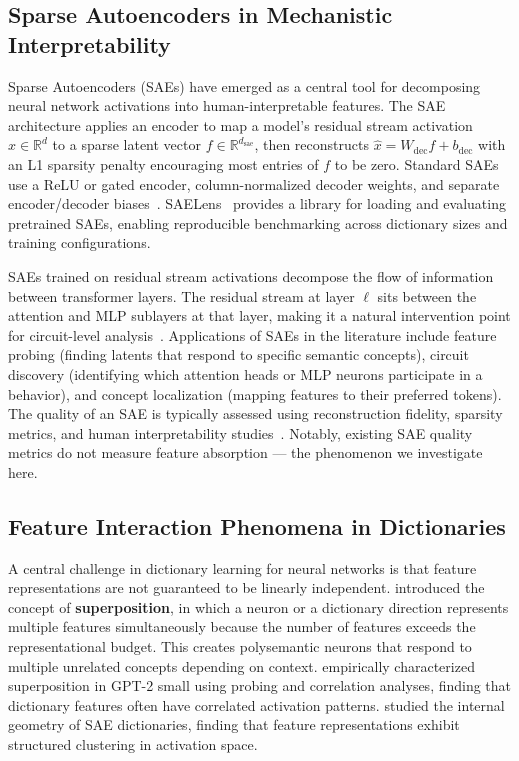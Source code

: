 \documentclass{article}
\begin{document}
\subsection{Sparse Autoencoders in Mechanistic Interpretability}

Sparse Autoencoders (SAEs) have emerged as a central tool for decomposing neural network activations into human-interpretable features. The SAE architecture applies an encoder to map a model's residual stream activation $x \in \mathbb{R}^d$ to a sparse latent vector $f \in \mathbb{R}^{d_{\text{sae}}}$, then reconstructs $\hat{x} = W_{\text{dec}} f + b_{\text{dec}}$ with an L1 sparsity penalty encouraging most entries of $f$ to be zero. Standard SAEs use a ReLU or gated encoder, column-normalized decoder weights, and separate encoder/decoder biases~\citep{bricken2023,anthropic2023}. SAELens~\citep{bloomfield2024} provides a library for loading and evaluating pretrained SAEs, enabling reproducible benchmarking across dictionary sizes and training configurations.

SAEs trained on residual stream activations decompose the flow of information between transformer layers. The residual stream at layer $\ell$ sits between the attention and MLP sublayers at that layer, making it a natural intervention point for circuit-level analysis~\citep{elhage2021}. Applications of SAEs in the literature include feature probing (finding latents that respond to specific semantic concepts), circuit discovery (identifying which attention heads or MLP neurons participate in a behavior), and concept localization (mapping features to their preferred tokens). The quality of an SAE is typically assessed using reconstruction fidelity, sparsity metrics, and human interpretability studies~\citep{bloomfield2024}. Notably, existing SAE quality metrics do not measure feature absorption --- the phenomenon we investigate here.

\subsection{Feature Interaction Phenomena in Dictionaries}

A central challenge in dictionary learning for neural networks is that feature representations are not guaranteed to be linearly independent. \citet{elhage2022} introduced the concept of \textbf{superposition}, in which a neuron or a dictionary direction represents multiple features simultaneously because the number of features exceeds the representational budget. This creates polysemantic neurons that respond to multiple unrelated concepts depending on context. \citet{sharkey2023} empirically characterized superposition in GPT-2 small using probing and correlation analyses, finding that dictionary features often have correlated activation patterns. \citet{templeton2025} studied the internal geometry of SAE dictionaries, finding that feature representations exhibit structured clustering in activation space.
\end{document}
